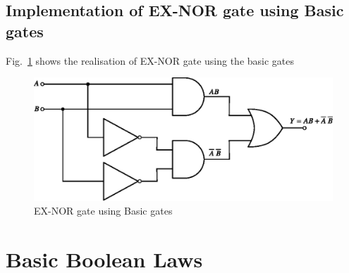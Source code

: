\subsection{Implementation of EX-NOR gate using Basic gates}\label{sec6.25.1}

Fig.~\ref{fig6.25} shows the realisation of EX-NOR gate using the basic gates
\begin{figure}[H]
\centering
\includegraphics{chap6/fig97_6.25.eps}
\caption{EX-NOR gate using Basic gates}\label{fig6.25}
\end{figure}

\section{Basic Boolean Laws}\label{sec6.26}

